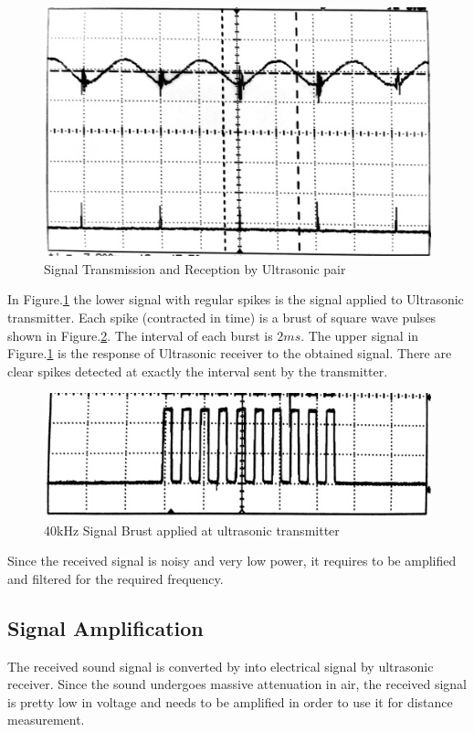 \begin{figure}
	\centering
	\includegraphics[width=120mm]{Images/UltrasonicTransception.jpg}
	\caption{Signal Transmission and Reception by Ultrasonic pair}
	\label{fig:UltrasonicTransception}
\end{figure}
In Figure.\ref{fig:UltrasonicTransception} the lower signal with regular spikes is the signal applied to Ultrasonic transmitter. Each spike (contracted in time) is a brust of square wave pulses shown in Figure.\ref{fig:SignalBrust}. The interval of each burst is $2ms$. The upper signal in Figure.\ref{fig:UltrasonicTransception} is the response of Ultrasonic receiver to the obtained signal. There are clear spikes  detected at exactly the interval sent by the transmitter.
\begin{figure}
	\centering
	\includegraphics[width=120mm]{Images/SignalBrust.jpg}
	\caption{40kHz Signal Brust applied at ultrasonic transmitter}
	\label{fig:SignalBrust}
\end{figure}
 
Since the received signal is noisy and very low power, it requires to be amplified and filtered for the required frequency.
\subsection{Signal Amplification}

The received sound signal is converted
by into electrical signal by ultrasonic receiver. Since the sound undergoes massive attenuation in air, the received signal is pretty low in voltage and needs to be amplified in order to use it for distance measurement. 


